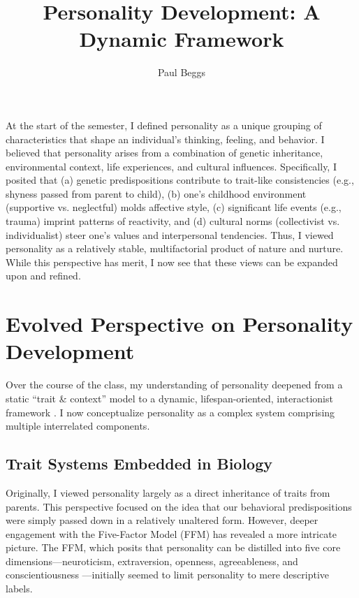 \documentclass[stu]{apa7}
\title{Personality Development: A Dynamic Framework}
\author{Paul Beggs}
\begin{document}
\maketitle

At the start of the semester, I defined personality as a unique grouping of characteristics that shape an individual's thinking, feeling, and behavior. I believed that personality arises from a combination of genetic inheritance, environmental context, life experiences, and cultural influences. Specifically, I posited that (a) genetic predispositions contribute to trait-like consistencies (e.g., shyness passed from parent to child), (b) one's childhood environment (supportive vs. neglectful) molds affective style, (c) significant life events (e.g., trauma) imprint patterns of reactivity, and (d) cultural norms (collectivist vs. individualist) steer one's values and interpersonal tendencies. Thus, I viewed personality as a relatively stable, multifactorial product of nature and nurture. While this perspective has merit, I now see that these views can be expanded upon and refined.

\section{Evolved Perspective on Personality Development}

Over the course of the class, my understanding of personality deepened from a static ``trait \& context'' model to a dynamic, lifespan-oriented, interactionist framework \parencite{burger2018personality}. I now conceptualize personality as a complex system comprising multiple interrelated components.

\subsection{Trait Systems Embedded in Biology}

Originally, I viewed personality largely as a direct inheritance of traits from parents. This perspective focused on the idea that our behavioral predispositions were simply passed down in a relatively unaltered form. However, deeper engagement with the Five-Factor Model (FFM) has revealed a more intricate picture. The FFM, which posits that personality can be distilled into five core dimensions—neuroticism, extraversion, openness, agreeableness, and conscientiousness \parencite{goldberg1990alternative}—initially seemed to limit personality to mere descriptive labels.
\end{document}
